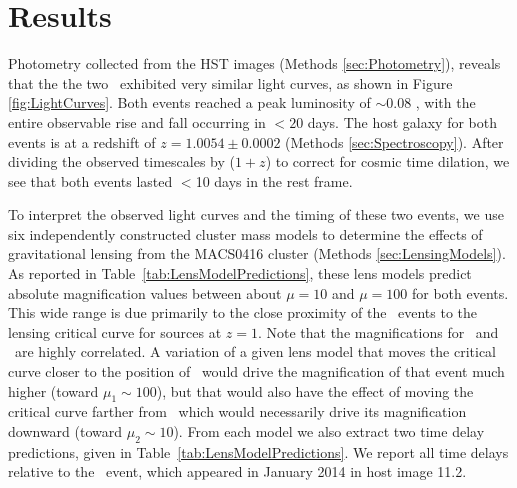 \section{Results}\label{sec:Results}

Photometry collected from the HST images (Methods
\ref{sec:Photometry}), reveals that the the two \spock\ exhibited very
similar light curves, as shown in Figure \ref{fig:LightCurves}.  Both
events reached a peak luminosity of $\sim$0.08 \microjansky, with the
entire observable rise and fall occurring in $<20$ days.  The host
galaxy for both \spock events is at a redshift of $z=1.0054\pm0.0002$
(Methods \ref{sec:Spectroscopy}).  After dividing the observed
timescales by ($1+z$) to correct for cosmic time dilation, we see that
both events lasted $<$10 days in the rest frame.

To interpret the observed light curves and the timing of these two
events, we use six independently constructed cluster mass models to
determine the effects of gravitational lensing from the
MACS0416 cluster (Methods \ref{sec:LensingModels}).  As reported in
Table~\ref{tab:LensModelPredictions}, these lens models predict
absolute magnification values between about $\mu=10$ and $\mu=100$ for
both events.  This wide range is due primarily to the close proximity
of the \spock\ events to the lensing critical curve for sources at
$z=1$.  Note that the magnifications for \spockone\ and \spocktwo\ are
highly correlated.  A variation of a given lens model that moves the
critical curve closer to the position of \spockone\ would drive the
magnification of that event much higher (toward $\mu_1\sim100$), but
that would also have the effect of moving the critical curve farther
from \spocktwo\, which would necessarily drive its magnification
downward (toward $\mu_2\sim10$). From each model we also extract two
time delay predictions, given in Table~\ref{tab:LensModelPredictions}.
We report all time delays relative to the \spockone\ event, which
appeared in January 2014 in host image 11.2.

